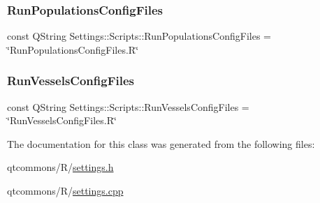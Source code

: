 \mbox{\label{classdisplace_1_1_r_1_1_settings_1_1_scripts_a3d3d7b8f8bba066373e940396b75692a}} 
\subsubsection{\texorpdfstring{RunPopulationsConfigFiles}{RunPopulationsConfigFiles}}
{\footnotesize\ttfamily const Q\+String Settings\+::\+Scripts\+::\+Run\+Populations\+Config\+Files = \char`\"{}Run\+Populations\+Config\+Files.\+R\char`\"{}\hspace{0.3cm}{\ttfamily [static]}}

\mbox{\label{classdisplace_1_1_r_1_1_settings_1_1_scripts_a3188be88653e460d41a7bb7d238005b6}} 
\subsubsection{\texorpdfstring{RunVesselsConfigFiles}{RunVesselsConfigFiles}}
{\footnotesize\ttfamily const Q\+String Settings\+::\+Scripts\+::\+Run\+Vessels\+Config\+Files = \char`\"{}Run\+Vessels\+Config\+Files.\+R\char`\"{}\hspace{0.3cm}{\ttfamily [static]}}



The documentation for this class was generated from the following files\+:\begin{DoxyCompactItemize}
\item 
qtcommons/\+R/\mbox{\hyperlink{qtcommons_2_r_2settings_8h}{settings.\+h}}\item 
qtcommons/\+R/\mbox{\hyperlink{qtcommons_2_r_2settings_8cpp}{settings.\+cpp}}\end{DoxyCompactItemize}
